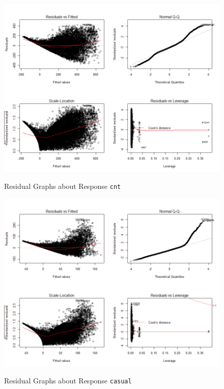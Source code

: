\begin{figure}[ht]
  \centering
  \includegraphics[width=\linewidth]{pic/cnt.png}\\
  \caption{Residual Graphs about Response \texttt{cnt}}\label{fig:cnt}
\end{figure}

\begin{figure}[ht]
  \centering
  \includegraphics[width=\linewidth]{pic/casual.png}\\
  \caption{Residual Graphs about Response \texttt{casual}}\label{fig:casual}
\end{figure}

